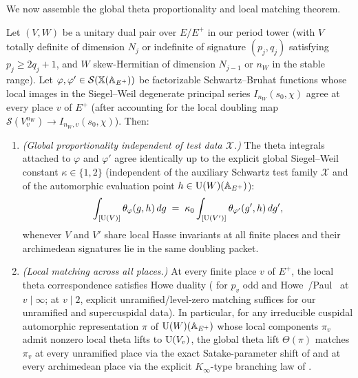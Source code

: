 We now assemble the global theta proportionality and local matching theorem.

\begin{theorem}
\label{thm:11:theta-agree}
Let $(V, W)$ be a unitary dual pair over $E/E^+$ in our period tower (with $V$ totally definite of dimension $N_j$ or indefinite of signature $(p_j, q_j)$ satisfying $p_j \ge 2q_j + 1$, and $W$ skew-Hermitian of dimension $N_{j-1}$ or $n_W$ in the stable range). Let $\varphi, \varphi' \in \mathcal{S}(\mathbb{X}(\mathbb{A}_{E^+}))$ be factorizable Schwartz--Bruhat functions whose local images in the Siegel--Weil degenerate principal series $I_{n_W}(s_0, \chi)$ agree at every place $v$ of $E^+$ (after accounting for the local doubling map $\mathcal{S}(V_v^{n_W}) \to I_{n_W, v}(s_0, \chi)$). Then:
\begin{enumerate}[label=\textup{(\roman*)}]
\item \emph{(Global proportionality independent of test data $\mathcal{X}$.)} The theta integrals attached to $\varphi$ and $\varphi'$ agree identically up to the explicit global Siegel--Weil constant $\kappa \in \{1, 2\}$ (independent of the auxiliary Schwartz test family $\mathcal{X}$ and of the automorphic evaluation point $h \in \mathrm{U}(W)(\mathbb{A}_{E^+})$):
  \begin{equation}
  \label{eq:11:theta-agree}
    \int_{[\mathrm{U}(V)]} \theta_\varphi(g, h)\, dg \;=\; \kappa_0 \int_{[\mathrm{U}(V')]} \theta_{\varphi'}(g', h)\, dg',
  \end{equation}
  whenever $V$ and $V'$ share local Hasse invariants at all finite places and their archimedean signatures lie in the same doubling packet.
\item \emph{(Local matching across all places.)} At every finite place $v$ of $E^+$, the local theta correspondence satisfies Howe duality ( for $p_v$ odd and Howe~\cite{Howe1989}/Paul~\cite{Paul1998} at $v \mid \infty$; at $v \mid 2$, explicit unramified/level-zero matching suffices for our unramified and supercuspidal data). In particular, for any irreducible cuspidal automorphic representation $\pi$ of $\mathrm{U}(W)(\mathbb{A}_{E^+})$ whose local components $\pi_v$ admit nonzero local theta lifts to $\mathrm{U}(V_v)$, the global theta lift $\Theta(\pi)$ matches $\pi_v$ at every unramified place via the exact Satake-parameter shift of \cite{Kudla1994} and at every archimedean place via the explicit $K_\infty$-type branching law of \cite{Paul1998,KnappVogan1995}.
\end{enumerate}
\end{theorem}

